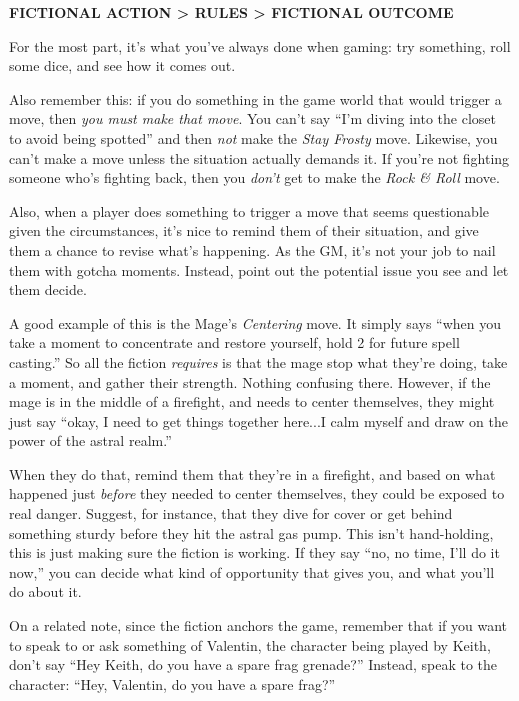 \documentclass[oneside,10pt]{article}
\begin{document}
\begin{multicols}{2}
\vspace{.1cm}
\begin{adjustwidth*}{1em}{0em}
{\orbitronfont \textbf{FICTIONAL ACTION > RULES > FICTIONAL OUTCOME}}
\end{adjustwidth*}
\vspace{.1cm}

For the most part, it’s what you’ve always done when gaming: try something, roll some dice, and see how it
comes out.


Also remember this: if you do something in the game world
that would trigger a move, then \textit{you must make that move}.
You can’t say “I’m diving into the closet to avoid being spotted” and then \textit{not} make the \textit{Stay Frosty} move. Likewise, you
can’t make a move unless the situation actually demands it.
If you’re not fighting someone who’s fighting back, then you
\textit{don’t} get to make the \textit{Rock \& Roll} move.


Also, when a player does something to trigger a move that
seems questionable given the circumstances, it’s nice to remind them of their situation, and give them a chance to revise what’s happening. As the GM, it’s not your job to nail
them with gotcha moments. Instead, point out the potential
issue you see and let them decide.


A good example of this is the Mage’s \textit{Centering} move. It
simply says ``when you take a moment to concentrate and
restore yourself, hold 2 for future spell casting.'' So all the fiction
\textit{requires} is that the mage stop what they’re doing, take a
moment, and gather their strength. Nothing confusing there.
However, if the mage is in the middle of a firefight, and needs
to center themselves, they might just say “okay, I need to get
things together here...I calm myself and draw on the power
of the astral realm.”


When they do that, remind them that they’re in a firefight, and
based on what happened just \textit{before} they needed to center
themselves, they could be exposed to real danger. Suggest,
for instance, that they dive for cover or get behind something
sturdy before they hit the astral gas pump. This isn’t hand-holding, this is just making sure the fiction is working. If they
say “no, no time, I’ll do it now,” you can decide what kind of
opportunity that gives you, and what you’ll do
about it.


On a related note, since the fiction anchors the game, remember that if you want to speak to or ask something of
Valentin, the character being played by Keith, don’t say “Hey
Keith, do you have a spare frag grenade?” Instead, speak to
the character: “Hey, Valentin, do you have a spare
frag?”



\end{multicols}
\end{document}

